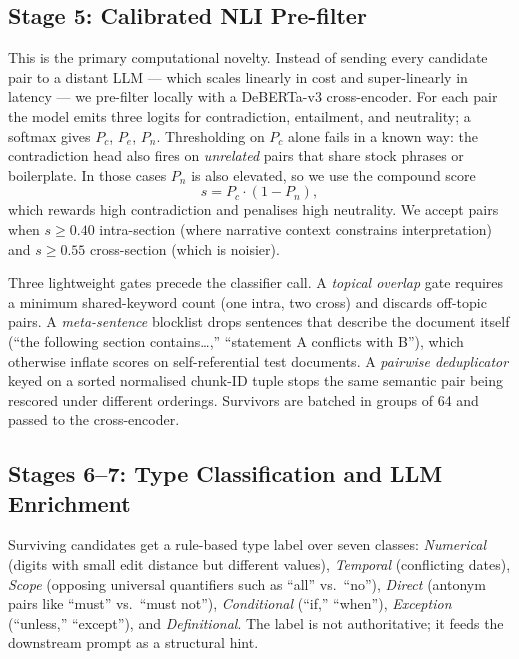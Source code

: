 \documentclass[conference]{IEEEtran}
\begin{document}
\subsection{Stage 5: Calibrated NLI Pre-filter}
This is the primary computational novelty. Instead of sending every candidate pair to a distant LLM --- which scales linearly in cost and super-linearly in latency --- we pre-filter locally with a DeBERTa-v3 cross-encoder. For each pair the model emits three logits for contradiction, entailment, and neutrality; a softmax gives $P_c$, $P_e$, $P_n$. Thresholding on $P_c$ alone fails in a known way: the contradiction head also fires on \emph{unrelated} pairs that share stock phrases or boilerplate. In those cases $P_n$ is also elevated, so we use the compound score
\begin{equation}
s = P_c \cdot (1 - P_n),
\label{eq:score}
\end{equation}
which rewards high contradiction and penalises high neutrality. We accept pairs when $s \geq 0.40$ intra-section (where narrative context constrains interpretation) and $s \geq 0.55$ cross-section (which is noisier).

Three lightweight gates precede the classifier call. A \emph{topical overlap} gate requires a minimum shared-keyword count (one intra, two cross) and discards off-topic pairs. A \emph{meta-sentence} blocklist drops sentences that describe the document itself (``the following section contains\ldots,'' ``statement A conflicts with B''), which otherwise inflate scores on self-referential test documents. A \emph{pairwise deduplicator} keyed on a sorted normalised chunk-ID tuple stops the same semantic pair being rescored under different orderings. Survivors are batched in groups of 64 and passed to the cross-encoder.

\subsection{Stages 6--7: Type Classification and LLM Enrichment}
Surviving candidates get a rule-based type label over seven classes: \emph{Numerical} (digits with small edit distance but different values), \emph{Temporal} (conflicting dates), \emph{Scope} (opposing universal quantifiers such as ``all'' vs.\ ``no''), \emph{Direct} (antonym pairs like ``must'' vs.\ ``must not''), \emph{Conditional} (``if,'' ``when''), \emph{Exception} (``unless,'' ``except''), and \emph{Definitional}. The label is not authoritative; it feeds the downstream prompt as a structural hint.
\end{document}
